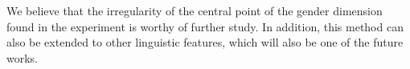 We believe that the irregularity of the central point of the gender dimension found in the experiment is worthy of further study. In addition, this method can also be extended to other linguistic features, which will also be one of the future works.